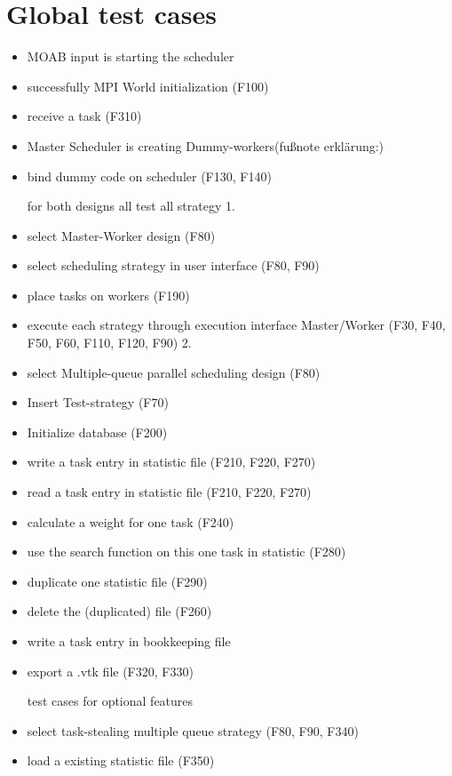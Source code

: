 \section{Global test cases}
		\begin{itemize}
			\item MOAB input is starting the scheduler
			\item successfully MPI World initialization (F100)
			
			\item receive a task (F310)
			\item Master Scheduler is creating Dummy-workers(fußnote erklärung:)
			\item bind dummy code on scheduler (F130, F140)
			
			for both designs all test all strategy
			1.
			\item select Master-Worker design (F80)
			\item select scheduling strategy in user interface (F80, F90)
			\item place tasks on workers (F190)
			\item execute each strategy through execution interface Master/Worker (F30, F40, F50, F60, 							F110, F120, F90)
			2.
			\item select Multiple-queue parallel scheduling design (F80)
			\item Insert Test-strategy (F70)
			
			\item Initialize database (F200)
			\item write a task entry in statistic file (F210, F220, F270)
			\item read a task entry in statistic file (F210, F220, F270)
			\item calculate a weight for one task (F240)
			\item use the search function on this one task in statistic (F280)
			\item duplicate one statistic file (F290)
			\item delete the (duplicated) file (F260)
			\item write a task entry in bookkeeping file
			\item export a .vtk file (F320, F330)
			
			test cases for optional features
			\item select task-stealing multiple queue strategy (F80, F90, F340)
			\item load a existing statistic file (F350)
		\end{itemize}
	